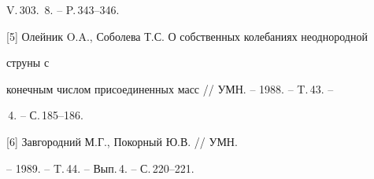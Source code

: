 V.\,303. \No\,8. -- P.\,343--346. 


 


[5] Олейник O.A., Соболева Т.С. О собственных колебаниях неоднородной 


струны с 


конечным числом присоединенных масс // УМН. -- 1988. -- T.\,43. -- 


\No\,4. -- С.\,185--186. 


 


[6] Завгородний М.Г., Покорный Ю.В. // УМН. 


-- 1989. -- T.\,44. -- Вып.\,4. -- С.\,220--221. 


 


 


 


 


